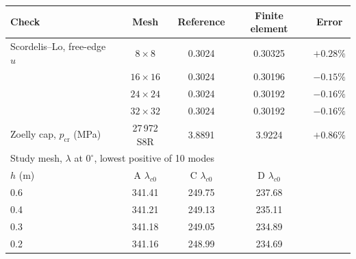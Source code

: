 \begin{tabular}{lcccc}
\toprule
Check & Mesh & Reference & Finite element & Error \\
\midrule
Scordelis--Lo, free-edge $u$ & $8\times 8$ & 0.3024 & 0.30325 & $+0.28\%$ \\
 & $16\times 16$ & 0.3024 & 0.30196 & $-0.15\%$ \\
 & $24\times 24$ & 0.3024 & 0.30192 & $-0.16\%$ \\
 & $32\times 32$ & 0.3024 & 0.30192 & $-0.16\%$ \\
Zoelly cap, $p_{\mathrm{cr}}$ (MPa) & 27\,972 S8R & 3.8891 & 3.9224 & $+0.86\%$ \\
\midrule
\multicolumn{5}{l}{Study mesh, $\lambda$ at $0^\circ$, lowest positive of 10 modes} \\
\midrule
$h$ (m) & A $\lambda_{c0}$ & C $\lambda_{c0}$ & D $\lambda_{c0}$ & \\
0.6 & 341.41 & 249.75 & 237.68 & \\
0.4 & 341.21 & 249.13 & 235.11 & \\
0.3 & 341.18 & 249.05 & 234.89 & \\
0.2 & 341.16 & 248.99 & 234.69 & \\
\bottomrule
\end{tabular}
